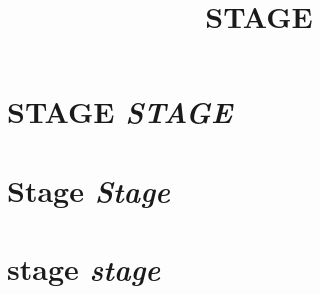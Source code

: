 \documentclass[letterpaper]{article}
\title{STAGE}
\date{}
\begin{document}
	\maketitle
   \section{STAGE \emph{STAGE}}
   \section{Stage \emph{Stage}}
   \section{stage \emph{stage}}
\end{document}
